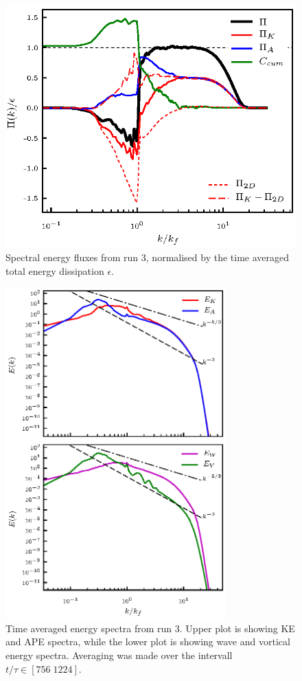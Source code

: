  
\begin{figure}[h]
\centerline{\includegraphics[angle=0]{./fig10.eps}}
 \caption{Spectral energy fluxes from run 3, normalised by the time averaged total energy dissipation $ \epsilon $. }
 \label{F2}
 \end{figure}
 

 
 \begin{figure}[h]
\centerline{\includegraphics[angle=0,width=8.5cm]{./fig11.eps}}
 \caption{ Time averaged energy spectra from run 3. Upper plot is showing KE and APE spectra, while the lower plot is showing wave and vortical energy spectra. Averaging was made over the intervall $ t/\tau \in [756 \; 1224] $.}
 \label{S2}
 \end{figure}
 
